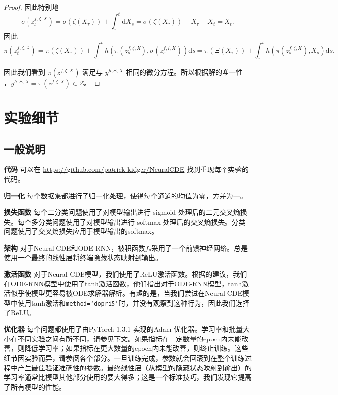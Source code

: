 \documentclass{ctexart}
\theoremstyle{plain}
\theoremstyle{definition}
\newcommand{\boldheading}[1]{

\textbf{#1}\quad}
\begin{document}
\begin{proof}
	因此特别地
\begin{equation*}
	\sigma(z^{f, \zeta, X}_t) = \sigma(\zeta(X_\tau)) + \int_\tau^t \mathrm{d}X_s = \sigma(\zeta(X_\tau))-X_\tau + X_t = X_t.
\end{equation*}
	因此
\begin{equation*}
	\pi(z^{f, \zeta, X}_t) = \pi(\zeta(X_\tau)) + \int_\tau^t h(\pi(z^{f, \zeta, X}_s), \sigma(z^{f, \zeta, X}_s)) \mathrm{d}s  = \pi(\Xi(X_\tau)) + \int_\tau^t h(\pi(z^{f, \zeta, X}_s), X_s) \mathrm{d}s.
\end{equation*}
	
	因此我们看到 $\pi(z^{f, \zeta, X})$ 满足与 $y^{h, \Xi, X}$ 相同的微分方程。所以根据解的唯一性 \cite[Theorem 1.3]{levy-lyons}，$y^{h, \Xi, X} = \pi(z^{f, \zeta, X}) \in \mathcal{Z}$。
\end{proof}
	
	\section{实验细节}\label{appendix:experimental-details}
	
	\subsection{一般说明}
	\boldheading{代码}
	可以在 \url{https://github.com/patrick-kidger/NeuralCDE} 找到重现每个实验的代码。
	
	\boldheading{归一化}
	每个数据集都进行了归一化处理，使得每个通道的均值为零，方差为一。
	
	\boldheading{损失函数}
	每个二分类问题使用了对模型输出进行 sigmoid 处理后的二元交叉熵损失。每个多分类问题使用了对模型输出进行 softmax 处理后的交叉熵损失。分类问题使用了交叉熵损失应用于模型输出的softmax。

	\boldheading{架构}
	对于Neural CDE和ODE-RNN，被积函数$f_\theta$采用了一个前馈神经网络。总是使用一个最终的线性层将终端隐藏状态映射到输出。
	
	\boldheading{激活函数}
	对于Neural CDE模型，我们使用了ReLU激活函数。根据\cite{latent-odes}的建议，我们在ODE-RNN模型中使用了tanh激活函数，他们指出对于ODE-RNN模型，tanh激活似乎使模型更容易被ODE求解器解析。有趣的是，当我们尝试在Neural CDE模型中使用tanh激活和\texttt{method=`dopri5'}时，并没有观察到这种行为，因此我们选择了ReLU。
	
	\boldheading{优化器}
	每个问题都使用了由PyTorch 1.3.1 \cite{pytorch}实现的Adam \cite{kingma2015}优化器。学习率和批量大小在不同实验之间有所不同，请参见下文。如果指标在一定数量的epoch内未能改善，则降低学习率；如果指标在更大数量的epoch内未能改善，则终止训练。这些细节因实验而异，请参阅各个部分。一旦训练完成，参数就会回滚到在整个训练过程中产生最佳验证准确性的参数。最终线性层（从模型的隐藏状态映射到输出）的学习率通常比模型其他部分使用的要大得多；这是一个标准技巧，我们发现它提高了所有模型的性能。
	
\end{document}
